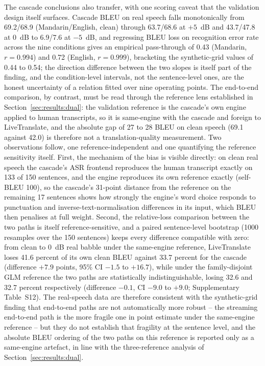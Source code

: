 The cascade conclusions also transfer, with one scoring caveat that the
validation design itself surfaces. Cascade BLEU on real speech falls
monotonically from 69.2/68.9 (Mandarin/English, clean) through 63.7/68.6
at $+5$~dB and 43.7/47.8 at $0$~dB to 6.9/7.6 at $-5$~dB, and regressing
BLEU loss on recognition error rate across the nine conditions gives an
empirical pass-through of 0.43 (Mandarin, $r = 0.994$) and 0.72 (English,
$r = 0.999$), bracketing the synthetic-grid values of 0.44 to 0.54; the
direction difference between the two slopes is itself part of the finding,
and the condition-level intervals, not the sentence-level ones, are the
honest uncertainty of a relation fitted over nine operating points. The
end-to-end comparison, by contrast, must be read through the
reference lens established in Section~\ref{sec:results:dual}: the validation
reference is the cascade's own engine applied to human transcripts, so it
is same-engine with the cascade and foreign to LiveTranslate, and the
absolute gap of 27 to 28 BLEU on clean speech (69.1 against 42.0) is
therefore not a translation-quality measurement. Two observations
follow, one reference-independent and one quantifying the reference
sensitivity itself. First, the mechanism of the
bias is visible directly: on clean real speech the cascade's ASR frontend
reproduces the human transcript exactly on 133 of 150 sentences, and the
engine reproduces its own reference exactly (self-BLEU 100), so the
cascade's 31-point distance from the reference on the remaining 17
sentences shows how strongly the engine's word choice responds to
punctuation and inverse-text-normalisation differences in its input,
which BLEU then penalises at full weight. Second, the relative-loss
comparison between the two paths is itself reference-sensitive, and a
paired sentence-level bootstrap (1000 resamples over the 150 sentences)
keeps every difference compatible with zero: from clean to 0~dB real
babble under the same-engine reference, LiveTranslate loses 41.6 percent
of its own clean BLEU against 33.7 percent for the cascade (difference
$+7.9$ points, 95\% CI $-1.5$ to $+16.7$), while under the
family-disjoint GLM reference the two paths are statistically
indistinguishable, losing 32.6 and 32.7 percent respectively (difference
$-0.1$, CI $-9.0$ to $+9.0$; Supplementary Table~S12). The real-speech
data are therefore consistent with the synthetic-grid finding that
end-to-end paths are not automatically more robust -- the streaming
end-to-end path is the more fragile one in point estimate under the
same-engine reference -- but they do not establish that fragility at the
sentence level, and the absolute BLEU ordering of the two paths on this
reference is reported only as a same-engine artefact, in line with
the three-reference analysis of Section~\ref{sec:results:dual}.

